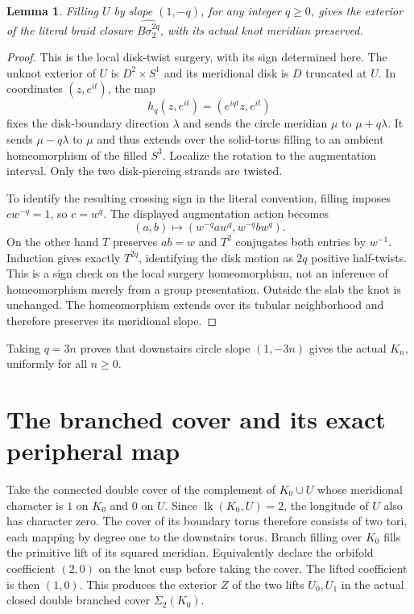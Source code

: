 \documentclass[11pt]{article}
\newtheorem{lemma}[theorem]{Lemma}
\newcommand{\Sig}{\Sigma_2}
\begin{document}
\begin{lemma}\label{lem:downstairs}
Filling $U$ by slope $(1,-q)$, for any integer $q\ge0$, gives the
exterior of the literal braid closure $\widehat{B\sigma_2^{2q}}$,
with its actual knot meridian preserved.
\end{lemma}
\begin{proof}
This is the local disk-twist surgery, with its sign determined here.
The unknot exterior of $U$ is $D^2\times S^1$ and its meridional disk
is $D$ truncated at $U$. In coordinates $(z,e^{it})$, the map
\[
                 h_q(z,e^{it})=(e^{iqt}z,e^{it})
\]
fixes the disk-boundary direction $\lambda$ and sends the circle
meridian $\mu$ to $\mu+q\lambda$. It sends $\mu-q\lambda$ to $\mu$
and thus extends over the solid-torus filling to an ambient
homeomorphism of the filled $S^3$. Localize the rotation to the
augmentation interval. Only the two disk-piercing strands are twisted.

To identify the resulting crossing sign in the literal convention,
filling imposes $cw^{-q}=1$, so $c=w^q$. The displayed augmentation
action becomes
\[
                    (a,b)\longmapsto
                    (w^{-q}aw^q,w^{-q}bw^q).
\]
On the other hand $T$ preserves $ab=w$ and $T^2$ conjugates both
entries by $w^{-1}$. Induction gives exactly $T^{2q}$, identifying
the disk motion as $2q$ positive half-twists. This is a sign check on
the local surgery homeomorphism, not an inference of homeomorphism
merely from a group presentation. Outside the slab the knot is
unchanged. The homeomorphism extends over its tubular neighborhood
and therefore preserves its meridional slope.
\end{proof}

Taking $q=3n$ proves that downstairs circle slope $(1,-3n)$ gives the
actual $K_n$, uniformly for all $n\ge0$.

\section{The branched cover and its exact peripheral map}

Take the connected double cover of the complement of $K_0\cup U$
whose meridional character is $1$ on $K_0$ and $0$ on $U$.
Since $\operatorname{lk}(K_0,U)=2$, the longitude of $U$ also has
character zero. The cover of its boundary torus therefore consists
of two tori, each mapping by degree one to the downstairs torus.
Branch filling over $K_0$ fills the primitive lift of its squared
meridian. Equivalently declare the orbifold coefficient $(2,0)$ on
the knot cusp before taking the cover. The lifted coefficient is then
$(1,0)$. This produces the exterior $Z$ of the two lifts $U_0,U_1$
in the actual closed double branched cover $\Sig(K_0)$.
\end{document}
